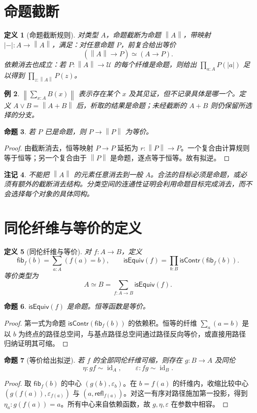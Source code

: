 \documentclass[12pt,oneside,openany,fontset=none]{ctexbook}
\theoremstyle{cn}
\newtheorem{definition}{定义}[chapter]
\newtheorem{example}[definition]{例}
\newtheorem{proposition}[definition]{命题}
\newtheorem{remark}[definition]{注记}
\numberwithin{equation}{chapter}
\newcommand{\U}{\mathcal U}
\newcommand{\id}{\operatorname{id}}
\newcommand{\refl}{\mathsf{refl}}
\newcommand{\isContr}{\mathsf{isContr}}
\newcommand{\isEquiv}{\mathsf{isEquiv}}
\newcommand{\fib}{\mathsf{fib}}
\newcommand{\trunc}[1]{\left\|#1\right\|}
\begin{document}
\section{命题截断}
\begin{definition}[命题截断规则]
对类型 $A$，命题截断为命题 $\trunc A$，带映射 $|-|:A\to\trunc A$，满足：对任意命题 $P$，前复合给出等价
\[
(\trunc A\to P)\simeq(A\to P).
\]
依赖消去也成立：若 $P:\trunc A\to\U$ 的每个纤维是命题，则给出 $\prod_{a:A}P(|a|)$ 足以得到 $\prod_{z:\trunc A}P(z)$。
\end{definition}
\begin{example}
$\trunc{\sum_{x:A}B(x)}$ 表示存在某个 $x$ 及其见证，但不记录具体是哪一个。定义 $A\lor B=\trunc{A+B}$ 后，析取的结果是命题；未经截断的 $A+B$ 则仍保留所选择的分支。
\end{example}
\begin{proposition}
若 $P$ 已是命题，则 $P\to\trunc P$ 为等价。
\end{proposition}
\begin{proof}
由截断消去，恒等映射 $P\to P$ 延拓为 $r:\trunc P\to P$。一个复合由计算规则等于恒等；另一个复合由于 $\trunc P$ 是命题，逐点等于恒等。故有拟逆。
\end{proof}
\begin{remark}
不能把 $\trunc A$ 的元素任意消去到一般 $A$。合法的目标必须是命题，或必须有额外的截断消去结构。分类空间的连通性证明会利用命题目标完成消去，而不会选择每个对象的具体同构。
\end{remark}

\section{同伦纤维与等价的定义}
\begin{definition}[同伦纤维与等价]
对 $f:A\to B$，定义
\[
\fib_f(b)=\sum_{a:A}(f(a)=b),
\qquad
\isEquiv(f)=\prod_{b:B}\isContr(\fib_f(b)).
\]
等价类型为
\[
A\simeq B=\sum_{f:A\to B}\isEquiv(f).
\]
\end{definition}
\begin{proposition}
$\isEquiv(f)$ 是命题。恒等函数是等价。
\end{proposition}
\begin{proof}
第一式为命题 $\isContr(\fib_f(b))$ 的依赖积。恒等的纤维 $\sum_a(a=b)$ 是以 $b$ 为终点的路径总空间，与基点路径总空间通过路径反向等价，或直接用路径归纳证明其可缩。
\end{proof}
\begin{proposition}[等价给出拟逆]
若 $f$ 的全部同伦纤维可缩，则存在 $g:B\to A$ 及同伦
\[
\eta:gf\sim\id_A,
\qquad\varepsilon:fg\sim\id_B.
\]
\end{proposition}
\begin{proof}
取 $\fib_f(b)$ 的中心 $(g(b),\varepsilon_b)$。在 $b=f(a)$ 的纤维内，收缩比较中心 $(g(f(a)),\varepsilon_{f(a)})$ 与 $(a,\refl_{f(a)})$。对这一有序对路径施加第一投影，得到 $\eta_a:g(f(a))=a$。所有中心来自依赖函数，故 $g,\eta,\varepsilon$ 在参数中相容。
\end{proof}
\end{document}
